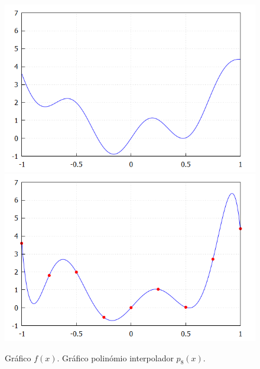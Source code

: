 \documentclass{article}
\begin{document}
\begin{figure}[H]
  \begin{center}
  \includegraphics[scale = 0.35]{./image3.png}
  \includegraphics[scale = 0.35]{./image4.png}
  \caption*{Gráfico $f(x)$.\hspace{45mm} Gráfico polinómio interpolador $p_8(x)$.}
  \end{center}
\end{figure}
\end{document}

